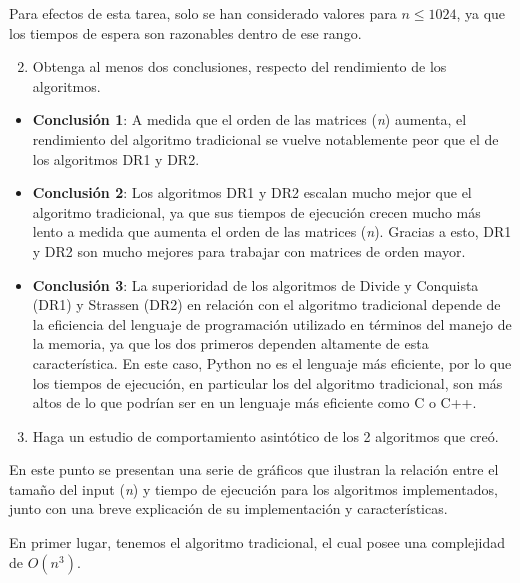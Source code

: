 \documentclass[12pt]{report}
\begin{document}
  Para efectos de esta tarea, solo se han considerado valores para $ n \leq 1024 $, ya que los tiempos de espera son razonables dentro de ese rango.
  
  \begin{enumerate}
    \setcounter{enumi}{1}
    \item Obtenga al menos dos conclusiones, respecto del rendimiento de los algoritmos.
  \end{enumerate}
  
  \begin{itemize}
    \item \textbf{Conclusión 1}: A medida que el orden de las matrices (\textit{n}) aumenta, el rendimiento del algoritmo tradicional se vuelve notablemente peor que el de los algoritmos DR1 y DR2.
    \item \textbf{Conclusión 2}: Los algoritmos DR1 y DR2 escalan mucho mejor que el algoritmo tradicional, ya que sus tiempos de ejecución crecen mucho más lento a medida que aumenta el orden de las matrices (\textit{n}). Gracias a esto, DR1 y DR2 son mucho mejores para trabajar con matrices de orden mayor.
    \item \textbf{Conclusión 3}: La superioridad de los algoritmos de Divide y Conquista (DR1) y Strassen (DR2) en relación con el algoritmo tradicional depende de la eficiencia del lenguaje de programación utilizado en términos del manejo de la memoria, ya que los dos primeros dependen altamente de esta característica. En este caso, Python no es el lenguaje más eficiente, por lo que los tiempos de ejecución, en particular los del algoritmo tradicional, son más altos de lo que podrían ser en un lenguaje más eficiente como C o C++.
  \end{itemize}

  \newpage
  
  \begin{enumerate}
    \setcounter{enumi}{2}
    \item Haga un estudio de comportamiento asintótico de los 2 algoritmos que creó.
  \end{enumerate}
  
  En este punto se presentan una serie de gráficos que ilustran la relación entre el tamaño del input (\textit{n}) y tiempo de ejecución para los algoritmos implementados, junto con una breve explicación de su implementación y características.
  
  En primer lugar, tenemos el algoritmo tradicional, el cual posee una complejidad de $ O(n^3) $.
\end{document}
